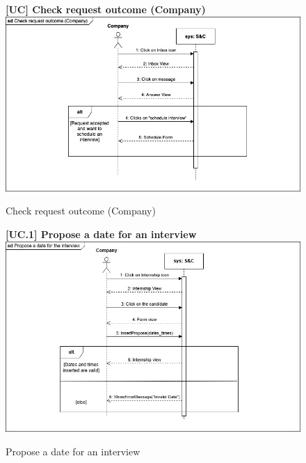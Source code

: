 \begin{figure}[H]
\textbf{[UC\nextUCDiagr] Check request outcome (Company)}\newline\newline
\includegraphics[width=15cm]{Images/UC_diagram/RASD-UC_CheckRequestOutcome(C).png}
    \caption{Check request outcome (Company)}
\end{figure}

\begin{figure}[H]
\textbf{[UC\nextUCDiagr.1] Propose a date for an interview}\newline\newline
\includegraphics[width=15cm]{Images/UC_diagram/RASD-UC18.drawio.png}
    \caption{Propose a date for an interview}
\end{figure}

